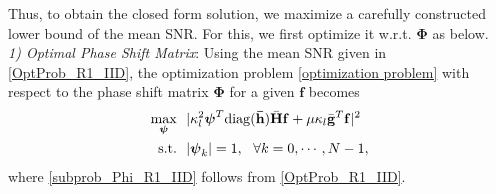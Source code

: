 \documentclass[journal,draftclsnofoot,onecolumn,12pt]{IEEEtran}
\begin{document}
Thus, to obtain the closed form solution, we  maximize a carefully constructed lower bound of  the mean SNR.  For this, we first optimize it w.r.t. $\mathbf{\Phi}$ as below. \\
\emph{1) Optimal Phase Shift Matrix}: Using the mean SNR given in \eqref{OptProb_R1_IID}, the optimization problem \eqref{optimization problem} with respect to the phase shift matrix $\mathbf{\Phi}$ for a given $\mathbf{f}$ becomes 
\begin{subequations}
\begin{align}
    \max_{\boldsymbol{\psi}}~~ &|\kappa_l^2 \boldsymbol{\psi}^T{\rm diag}(\mathbf{\bar{h}})\Bar{\mathbf{H}}\mathbf{f} +\mu \kappa_l \bar{\mathbf{g}}^T\mathbf{f}|^2\label{subprob_Phi_R1_IID} \\
    {\rm\text{s.t.}}~~&|\boldsymbol{\psi}_k|=1, ~~\forall k=0,\cdots,N-1,\label{constraint_Phi_R1_IID}
\end{align}
\end{subequations} 
where \eqref{subprob_Phi_R1_IID} follows from \eqref{OptProb_R1_IID}. %
\end{document}
